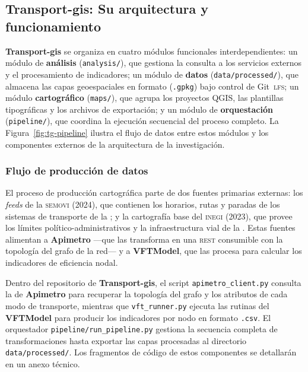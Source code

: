 \subsection{Transport-gis: Su arquitectura y funcionamiento}
\label{subsec:transport-gis-arquitectura-funcionamiento}

\textbf{Transport-gis} se organiza en cuatro módulos funcionales interdependientes: un módulo de \textbf{análisis} (\texttt{analysis/}), que gestiona la consulta a los servicios 
externos y el procesamiento de indicadores; un módulo de \textbf{datos} (\texttt{data/processed/}), que almacena las capas geoespaciales en formato  (\texttt{.gpkg}) 
bajo control de Git~\textsc{lfs}; un módulo \textbf{cartográfico} (\texttt{maps/}), que agrupa los proyectos QGIS, las plantillas tipográficas y los archivos de exportación; y un 
módulo de \textbf{orquestación} (\texttt{pipeline/}), que coordina la ejecución secuencial del proceso completo. La Figura~\ref{fig:tg-pipeline} ilustra el flujo de datos 
entre estos módulos y los componentes externos de la arquitectura de la investigación.

\subsubsection{Flujo de producción de datos}
\label{subsubsec:tg-flujo-datos}

El proceso de producción cartográfica parte de dos fuentes primarias externas: los \textit{feeds} \gtfs{} de la \textsc{semovi} (2024), que contienen los horarios, 
rutas y paradas de los sistemas de transporte de la \cdmx{}; y la cartografía base del \textsc{inegi} (2023), que provee los límites político-administrativos y la 
infraestructura vial de la \zmvm{}. Estas fuentes alimentan a \textbf{Apimetro} —que las transforma en una \api{} \textsc{rest} consumible con la topología del 
grafo de la red— y a \textbf{VFTModel}, que las procesa para calcular los indicadores de eficiencia nodal.

Dentro del repositorio de \textbf{Transport-gis}, el script \texttt{apimetro\_client.py} consulta la \api{} de \textbf{Apimetro} para recuperar la topología del 
grafo y los atributos de cada modo de transporte, mientras que \texttt{vft\_runner.py} ejecuta las rutinas del \textbf{VFTModel} para producir los indicadores por nodo en 
formato \texttt{.csv}. El orquestador \texttt{pipeline/run\_pipeline.py} gestiona la secuencia completa de transformaciones hasta exportar las capas procesadas al 
directorio \texttt{data/processed/}. Los fragmentos de código de estos componentes se detallarán en un anexo técnico.

